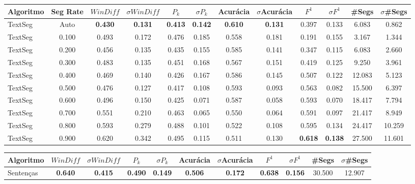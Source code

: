 \documentclass{article}
\begin{document}
\newpage
\tiny\begin{longtable}[c]{|l|c|c|c|c|c|c|c|c|c|c|c|} 
\hline 
Algoritmo & Seg Rate & $WinDiff$ & $\sigma$$WinDiff$ & $P_k$ & $\sigma$$P_k$ & Acurácia & $\sigma$Acurácia & $F^1$ & $\sigma$$F^1$ & \#Segs & $\sigma$\#Segs\\ \hline 
TextSeg & Auto & \cellcolor{gray!20} \textbf{0.430} & \cellcolor{gray!20} \textbf{0.131} & \cellcolor{gray!20} \textbf{0.413} & \cellcolor{gray!20} \textbf{0.142} & \cellcolor{gray!20} \textbf{0.610} & \cellcolor{gray!20} \textbf{0.131} & 0.397 & 0.133 & 6.083 & 0.862  \\ \hline 
 TextSeg & 0.100 & 0.493 & 0.172 & 0.476 & 0.185 & 0.558 & 0.181 & 0.191 & 0.155 & 3.167 & 1.344  \\ \hline 
 TextSeg & 0.200 & 0.456 & 0.135 & 0.435 & 0.155 & 0.585 & 0.141 & 0.347 & 0.115 & 6.083 & 2.660  \\ \hline 
 TextSeg & 0.300 & 0.483 & 0.135 & 0.451 & 0.168 & 0.567 & 0.151 & 0.419 & 0.125 & 9.250 & 3.961  \\ \hline 
 TextSeg & 0.400 & 0.469 & 0.140 & 0.426 & 0.167 & 0.586 & 0.145 & 0.507 & 0.122 & 12.083 & 5.123  \\ \hline 
 TextSeg & 0.500 & 0.476 & 0.127 & 0.417 & 0.108 & 0.593 & 0.093 & 0.563 & 0.082 & 15.500 & 6.397  \\ \hline 
 TextSeg & 0.600 & 0.496 & 0.150 & 0.425 & 0.071 & 0.587 & 0.058 & 0.593 & 0.070 & 18.417 & 7.794  \\ \hline 
 TextSeg & 0.700 & 0.551 & 0.210 & 0.463 & 0.065 & 0.550 & 0.064 & 0.591 & 0.097 & 21.417 & 8.949  \\ \hline 
 TextSeg & 0.800 & 0.593 & 0.279 & 0.488 & 0.101 & 0.522 & 0.108 & 0.595 & 0.134 & 24.417 & 10.259  \\ \hline 
 TextSeg & 0.900 & 0.620 & 0.342 & 0.495 & 0.115 & 0.511 & 0.130 & \cellcolor{gray!20} \textbf{0.618} & \cellcolor{gray!20} \textbf{0.138} & 27.500 & 11.601  \\ \hline 
 \end{longtable} 
\newpage
\tiny\begin{longtable}[c]{|l|c|c|c|c|c|c|c|c|c|c|} 
\hline 
Algoritmo & $WinDiff$ & $\sigma$$WinDiff$ & $P_k$ & $\sigma$$P_k$ & Acurácia & $\sigma$Acurácia & $F^1$ & $\sigma$$F^1$ & \#Segs & $\sigma$\#Segs\\ \hline 
Sentenças & \cellcolor{gray!20} \textbf{0.640} & \cellcolor{gray!20} \textbf{0.415} & \cellcolor{gray!20} \textbf{0.490} & \cellcolor{gray!20} \textbf{0.149} & \cellcolor{gray!20} \textbf{0.506} & \cellcolor{gray!20} \textbf{0.172} & \cellcolor{gray!20} \textbf{0.638} & \cellcolor{gray!20} \textbf{0.156} & 30.500 & 12.907  \\ \hline 
 \end{longtable} 
\newpage
\end{document}
